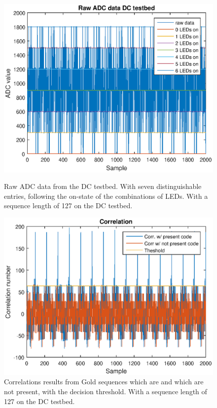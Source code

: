 \begin{figure}[!tbp]
  \centering
  \begin{minipage}[b]{0.49\textwidth}
    \includegraphics[width=\textwidth]{chapters/evaluation-chapters/hardware/dc/raw-dc-testbed-adc-data-n=7.eps}
    \caption{Raw ADC data from the DC testbed. With seven distinguishable entries, following the on-state of the combinations of LEDs. With a sequence length of 127  on the DC testbed.}
	\label{fig:raw-dc-testbed-adc-data-n=7}
  \end{minipage}
  \hfill
  \begin{minipage}[b]{0.49\textwidth}
    \includegraphics[width=\textwidth]{chapters/evaluation-chapters/hardware/dc/correlation-dc-testbed-n=7.eps}
    \caption{Correlations results from Gold sequences which are and which are not present, with the decision threshold. With a sequence length of 127 on the DC testbed.}
	\label{fig:correlation-dc-testbed-n=7}
  \end{minipage}
\end{figure}


